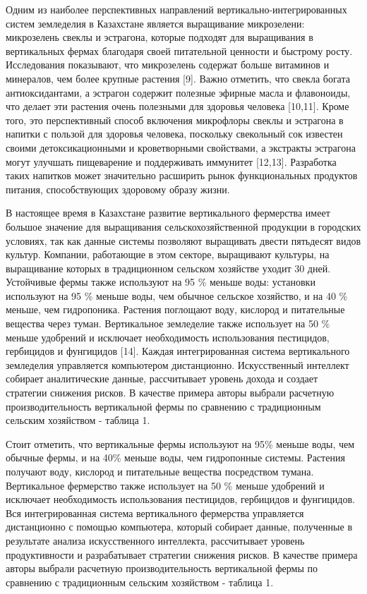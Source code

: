 \begin{multicols}{2}
Одним из наиболее перспективных направлений вертикально-интегрированных
систем земледелия в Казахстане является выращивание микрозелени:
микрозелень свеклы и эстрагона, которые подходят для выращивания в
вертикальных фермах благодаря своей питательной ценности и быстрому
росту. Исследования показывают, что микрозелень содержат больше
витаминов и минералов, чем более крупные растения {[}9{]}. Важно
отметить, что свекла богата антиоксидантами, а эстрагон содержит
полезные эфирные масла и флавоноиды, что делает эти растения очень
полезными для здоровья человека {[}10,11{]}. Кроме того, это
перспективный способ включения микрофлоры свеклы и эстрагона в напитки с
пользой для здоровья человека, поскольку свекольный сок известен своими
детоксикационными и кроветворными свойствами, а экстракты эстрагона
могут улучшать пищеварение и поддерживать иммунитет {[}12,13{]}.
Разработка таких напитков может значительно расширить рынок
функциональных продуктов питания, способствующих здоровому образу жизни.

В настоящее время в Казахстане развитие вертикального фермерства имеет
большое значение для выращивания сельскохозяйственной продукции в
городских условиях, так как данные системы позволяют выращивать двести
пятьдесят видов культур. Компании, работающие в этом секторе, выращивают
культуры, на выращивание которых в традиционном сельском хозяйстве
уходит 30 дней. Устойчивые фермы также используют на 95 \% меньше воды:
установки используют на 95 \% меньше воды, чем обычное сельское
хозяйство, и на 40 \% меньше, чем гидропоника. Растения поглощают воду,
кислород и питательные вещества через туман. Вертикальное земледелие
также использует на 50 \% меньше удобрений и исключает необходимость
использования пестицидов, гербицидов и фунгицидов {[}14{]}. Каждая
интегрированная система вертикального земледелия управляется компьютером
дистанционно. Искусственный интеллект собирает аналитические данные,
рассчитывает уровень дохода и создает стратегии снижения рисков. В
качестве примера авторы выбрали расчетную производительность
вертикальной фермы по сравнению с традиционным сельским хозяйством -
таблица 1.

Стоит отметить, что вертикальные фермы используют на 95\% меньше воды,
чем обычные фермы, и на 40\% меньше воды, чем гидропонные системы.
Растения получают воду, кислород и питательные вещества посредством
тумана. Вертикальное фермерство также использует на 50 \% меньше
удобрений и исключает необходимость использования пестицидов, гербицидов
и фунгицидов. Вся интегрированная система вертикального фермерства
управляется дистанционно с помощью компьютера, который собирает данные,
полученные в результате анализа искусственного интеллекта, рассчитывает
уровень продуктивности и разрабатывает стратегии снижения рисков. В
качестве примера авторы выбрали расчетную производительность
вертикальной фермы по сравнению с традиционным сельским хозяйством -
таблица 1.
\end{multicols}


